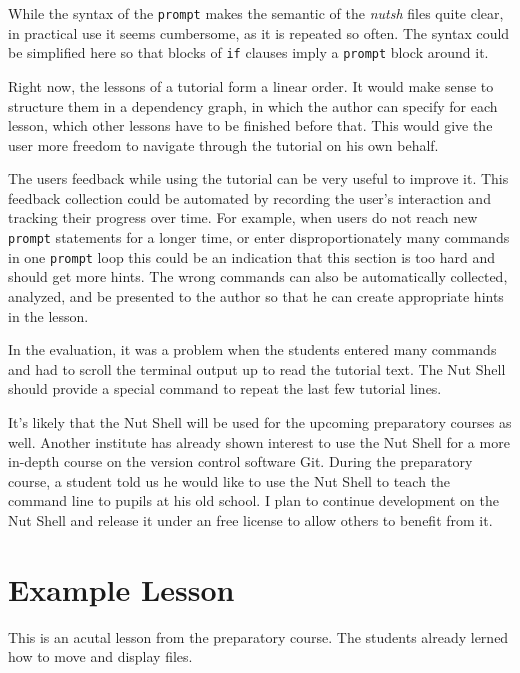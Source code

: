 \documentclass[paper=a4,twoside,abstract=on,cleardoublepage=empty,numbers=noenddot,toc=bib,11pt,appendixprefix=true]{scrreprt}
\begin{document}
While the syntax of the \texttt{prompt} makes the semantic of the \emph{nutsh} files quite clear, in practical use it seems cumbersome, as it is repeated so often. The syntax could be simplified here so that blocks of \texttt{if} clauses imply a \texttt{prompt} block around it.

Right now, the lessons of a tutorial form a linear order. It would make sense to structure them in a dependency graph, in which the author can specify for each lesson, which other lessons have to be finished before that. This would give the user more freedom to navigate through the tutorial on his own behalf.



The users feedback while using the tutorial can be very useful to improve it. This feedback collection could be automated by recording the user's interaction and tracking their progress over time. For example, when users do not reach new \texttt{prompt} statements for a longer time, or enter disproportionately many commands in one \texttt{prompt} loop this could be an indication that this section is too hard and should get more hints. The wrong commands can also be automatically collected, analyzed, and be presented to the author so that he can create appropriate hints in the lesson.

In the evaluation, it was a problem when the students entered many commands and had to scroll the terminal output up to read the tutorial text. The Nut Shell should provide a special command to repeat the last few tutorial lines.

It's likely that the Nut Shell will be used for the upcoming preparatory courses as well. Another institute has already shown interest to use the Nut Shell for a more in-depth course on the version control software Git. During the preparatory course, a student told us he would like to use the Nut Shell to teach the command line to pupils at his old school. I plan to continue development on the Nut Shell and release it under an free license to allow others to benefit from it.

\cleardoublepage
\appendix

\chapter{Example Lesson}
\label{sec:nutshexample}

This is an acutal lesson from the preparatory course. The students already lerned how to move and display files.
\end{document}
